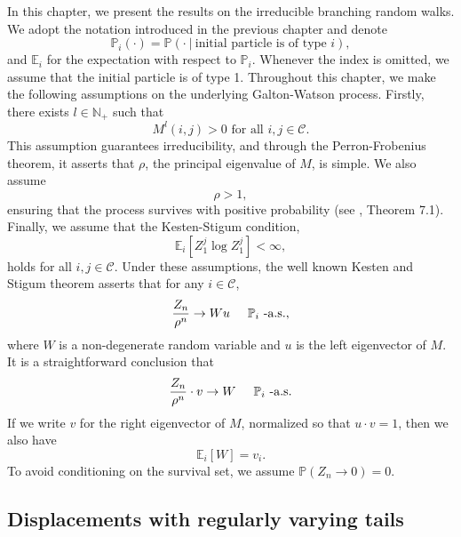 \documentclass[12pt]{article}
\numberwithin{equation}{section}
\begin{document}
In this chapter, we present the results on the irreducible branching random walks. We adopt the notation introduced in the previous chapter and denote \[\mathbb{P}_i(\cdot)=\mathbb{P}\left(\cdot \ | \ \text{initial particle is of type } i \right), \]
and $\mathbb{E}_i$ for the expectation with respect to $\mathbb{P}_i$. Whenever the index is omitted, we assume that the initial particle is of type 1.
Throughout this chapter, we make the following assumptions on the underlying Galton-Watson process.
Firstly, there exists $l \in \mathbb{N}_+$ such that 
\begin{equation}\label{as3}
    M^l(i,j) > 0 \text{ for all } i,j \in \mathcal{C}.
\end{equation} 
This assumption guarantees irreducibility, and through the Perron-Frobenius theorem, it asserts that $\rho$, the principal eigenvalue of $M$, is simple. We also assume \begin{equation}\label{as1} 
    \rho > 1,
\end{equation} 
ensuring that the process survives with positive probability (see \cite{harris}, Theorem 7.1). Finally, we assume that the Kesten-Stigum condition,
\begin{equation}\label{as2}
    \mathbb{E}_i[Z_1^j \log Z_1^j] < \infty,
\end{equation}
holds for all $i,j \in \mathcal{C}$.
Under these assumptions, the well known Kesten and Stigum theorem \cite{kesten} asserts that for any $i \in \mathcal{C}$, \begin{equation}\label{limit}
    \frac{Z_n} {\rho^n}  \rightarrow Wu \hspace{0.5cm} \mathbb{P}_i\text{ -a.s.},
\end{equation} where $W$ is a non-degenerate random variable and $u$ is the left eigenvector of $M$. It is a straightforward conclusion that 
\begin{equation}\label{limitscalar}
\frac{Z_n} {\rho^n} \cdot v \rightarrow W \hspace{0.5cm} \mathbb{P}_i\text{ -a.s.}
\end{equation}If we write $v$ for the right eigenvector of $M$, normalized so that $u\cdot v = 1$, then we also have
\begin{equation}\label{heavytailmean}
        \mathbb{E}_i[W] = v_i.
\end{equation}
 To avoid conditioning on the survival set, we assume $  \mathbb{P}(  Z_n \rightarrow 0) = 0$. 

\subsection{Displacements with regularly varying tails}
\end{document}
